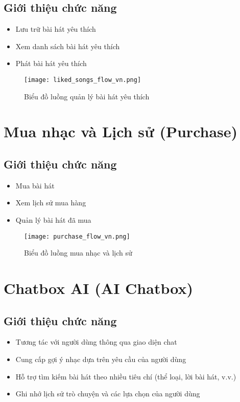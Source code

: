 \documentclass{book}
\let\oldsection\section
\renewcommand{\section}{\clearpage\oldsection}
\begin{document}
\subsection{Giới thiệu chức năng}
\begin{itemize}
    \item Lưu trữ bài hát yêu thích
    \item Xem danh sách bài hát yêu thích
    \item Phát bài hát yêu thích
\end{itemize}

\begin{figure}[htbp]
    \centering
    \texttt{[image: liked\_songs\_flow\_vn.png]}
    \caption{Biểu đồ luồng quản lý bài hát yêu thích}
    \label{fig:liked_songs_flow}
\end{figure}

\section{Mua nhạc và Lịch sử (Purchase)}
\subsection{Giới thiệu chức năng}
\begin{itemize}
    \item Mua bài hát
    \item Xem lịch sử mua hàng
    \item Quản lý bài hát đã mua
\end{itemize}


\begin{figure}[htbp]
    \centering
    \texttt{[image: purchase\_flow\_vn.png]}
    \caption{Biểu đồ luồng mua nhạc và lịch sử}
    \label{fig:purchase_flow}
\end{figure}

\section{Chatbox AI (AI Chatbox)}
\subsection{Giới thiệu chức năng}
\begin{itemize}
    \item Tương tác với người dùng thông qua giao diện chat
    \item Cung cấp gợi ý nhạc dựa trên yêu cầu của người dùng
    \item Hỗ trợ tìm kiếm bài hát theo nhiều tiêu chí (thể loại, lời bài hát, v.v.)
    \item Ghi nhớ lịch sử trò chuyện và các lựa chọn của người dùng
\end{itemize}
\end{document}
